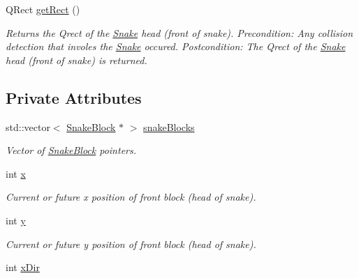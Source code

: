 \begin{DoxyCompactItemize}
\-Q\-Rect \hyperlink{classSnake_a71b566d9cbf90ff5533ff0a963576150}{get\-Rect} ()
\begin{DoxyCompactList}\small\item\em \-Returns the \-Qrect of the \hyperlink{classSnake}{\-Snake} head (front of snake). \-Precondition\-: \-Any collision detection that involes the \hyperlink{classSnake}{\-Snake} occured. \-Postcondition\-: \-The \-Qrect of the \hyperlink{classSnake}{\-Snake} head (front of snake) is returned. \end{DoxyCompactList}\end{DoxyCompactItemize}
\subsection*{\-Private \-Attributes}
\begin{DoxyCompactItemize}
\item 
\hypertarget{classSnake_a1ee5aed86699752da1f1c8370b2ac10f}{std\-::vector$<$ \hyperlink{classSnakeBlock}{\-Snake\-Block} $\ast$ $>$ \hyperlink{classSnake_a1ee5aed86699752da1f1c8370b2ac10f}{snake\-Blocks}}\label{classSnake_a1ee5aed86699752da1f1c8370b2ac10f}

\begin{DoxyCompactList}\small\item\em \-Vector of \hyperlink{classSnakeBlock}{\-Snake\-Block} pointers. \end{DoxyCompactList}\item 
\hypertarget{classSnake_a3b04724ab4b1af28afa2e6656f96eeb8}{int \hyperlink{classSnake_a3b04724ab4b1af28afa2e6656f96eeb8}{x}}\label{classSnake_a3b04724ab4b1af28afa2e6656f96eeb8}

\begin{DoxyCompactList}\small\item\em \-Current or future x position of front block (head of snake). \end{DoxyCompactList}\item 
\hypertarget{classSnake_ae5de2b952ebcabe85bfab67f086fa114}{int \hyperlink{classSnake_ae5de2b952ebcabe85bfab67f086fa114}{y}}\label{classSnake_ae5de2b952ebcabe85bfab67f086fa114}

\begin{DoxyCompactList}\small\item\em \-Current or future y position of front block (head of snake). \end{DoxyCompactList}\item 
\hypertarget{classSnake_a539e9605b40dfd9a305fe3ed5af422a3}{int \hyperlink{classSnake_a539e9605b40dfd9a305fe3ed5af422a3}{x\-Dir}}\label{classSnake_a539e9605b40dfd9a305fe3ed5af422a3}


\end{DoxyCompactItemize}
